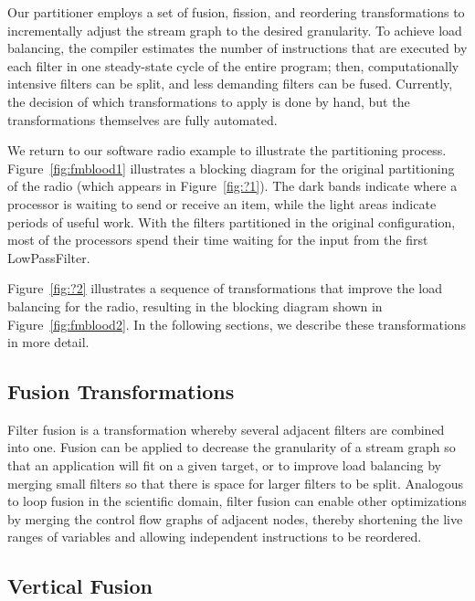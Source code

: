 Our partitioner employs a set of fusion, fission, and reordering
transformations to incrementally adjust the stream graph to the
desired granularity.  To achieve load balancing, the compiler
estimates the number of instructions that are executed by each filter
in one steady-state cycle of the entire program; then, computationally
intensive filters can be split, and less demanding filters can be
fused.  Currently, the decision of which transformations to apply is
done by hand, but the transformations themselves are fully automated.

We return to our software radio example to illustrate the partitioning
process.  Figure~\ref{fig:fmblood1} illustrates a blocking diagram for
the original partitioning of the radio (which appears in
Figure~\ref{fig:?1}).  The dark bands indicate where a processor is
waiting to send or receive an item, while the light areas indicate
periods of useful work.  With the filters partitioned in the original
configuration, most of the processors spend their time waiting for the
input from the first LowPassFilter.

Figure~\ref{fig:?2} illustrates a sequence of transformations that
improve the load balancing for the radio, resulting in the blocking
diagram shown in Figure~\ref{fig:fmblood2}.   In the following sections, we describe these
transformations in more detail.


\subsection{Fusion Transformations}

Filter fusion is a transformation whereby several adjacent filters are
combined into one.  Fusion can be applied to decrease the granularity
of a stream graph so that an application will fit on a given target,
or to improve load balancing by merging small filters so that there is
space for larger filters to be split.  Analogous to loop fusion in the
scientific domain, filter fusion can enable other optimizations by
merging the control flow graphs of adjacent nodes, thereby shortening
the live ranges of variables and allowing independent instructions to
be reordered.

\subsection{Vertical Fusion}

